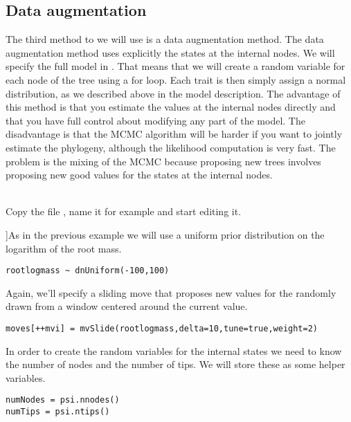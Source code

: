 \subsection{Data augmentation}

The third method to we will use is a data augmentation method. The data augmentation method uses explicitly the states at the internal nodes. We will specify the full model in \Rev.
That means that we will create a random variable for each node of the tree using a for loop. Each trait is then simply assign a normal distribution, as we described above in the model description.
The advantage of this method is that you estimate the values at the internal nodes directly and that you have full control about modifying any part of the model. The disadvantage is that the MCMC algorithm will be harder if you want to jointly estimate the phylogeny, although the likelihood computation is very fast. The problem is the mixing of the MCMC because proposing new trees involves proposing new good values for the states at the internal nodes.

\noindent \\ \impmark Copy the file , name it for example  and start editing it.

]As in the previous example we will use a uniform prior distribution on the logarithm of the root mass.
{\tt \small \begin{snugshade*}
\begin{lstlisting}
rootlogmass ~ dnUniform(-100,100)
\end{lstlisting}
\end{snugshade*}}
Again, we'll specify a sliding move that proposes new values for the  randomly drawn from a window centered around the current value.
{\tt \small \begin{snugshade*}
\begin{lstlisting}
moves[++mvi] = mvSlide(rootlogmass,delta=10,tune=true,weight=2) 
\end{lstlisting}
\end{snugshade*}}

In order to create the random variables for the internal states we need to know the number of nodes and the number of tips.
We will store these as some helper variables.
{\tt \small \begin{snugshade*}
\begin{lstlisting}
numNodes = psi.nnodes()
numTips = psi.ntips()
\end{lstlisting}
\end{snugshade*}}

